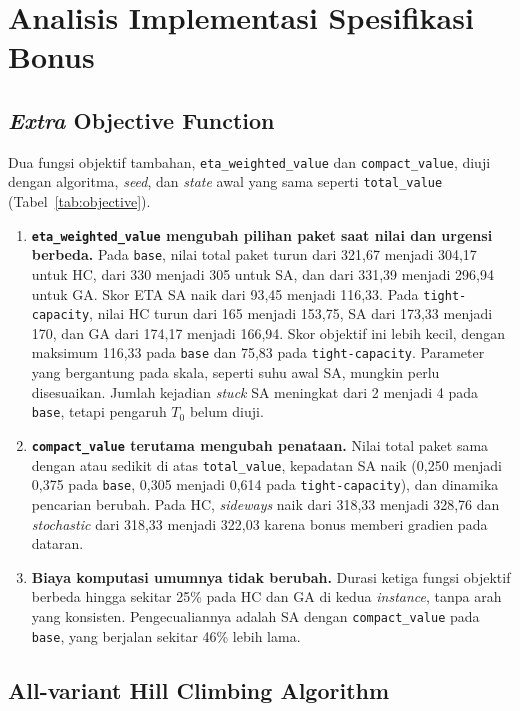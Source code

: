 \section{Analisis Implementasi Spesifikasi Bonus}

\subsection{\textit{Extra} Objective Function}

Dua fungsi objektif tambahan, \texttt{eta\_weighted\_value} dan \texttt{compact\_value}, diuji dengan algoritma, \textit{seed}, dan \textit{state} awal yang sama seperti \texttt{total\_value} (Tabel~\ref{tab:objective}).

\begin{enumerate}
    \item \textbf{\texttt{eta\_weighted\_value} mengubah pilihan paket saat nilai dan urgensi berbeda.} Pada \texttt{base}, nilai total paket turun dari 321,67 menjadi 304,17 untuk HC, dari 330 menjadi 305 untuk SA, dan dari 331,39 menjadi 296,94 untuk GA. Skor ETA SA naik dari 93,45 menjadi 116,33. Pada \texttt{tight-capacity}, nilai HC turun dari 165 menjadi 153,75, SA dari 173,33 menjadi 170, dan GA dari 174,17 menjadi 166,94. Skor objektif ini lebih kecil, dengan maksimum 116,33 pada \texttt{base} dan 75,83 pada \texttt{tight-capacity}. Parameter yang bergantung pada skala, seperti suhu awal SA, mungkin perlu disesuaikan. Jumlah kejadian \textit{stuck} SA meningkat dari 2 menjadi 4 pada \texttt{base}, tetapi pengaruh $T_0$ belum diuji.
    \item \textbf{\texttt{compact\_value} terutama mengubah penataan.} Nilai total paket sama dengan atau sedikit di atas \texttt{total\_value}, kepadatan SA naik (0,250 menjadi 0,375 pada \texttt{base}, 0,305 menjadi 0,614 pada \texttt{tight-capacity}), dan dinamika pencarian berubah. Pada HC, \textit{sideways} naik dari 318,33 menjadi 328,76 dan \textit{stochastic} dari 318,33 menjadi 322,03 karena bonus memberi gradien pada dataran.
    \item \textbf{Biaya komputasi umumnya tidak berubah.} Durasi ketiga fungsi objektif berbeda hingga sekitar 25\% pada HC dan GA di kedua \textit{instance}, tanpa arah yang konsisten. Pengecualiannya adalah SA dengan \texttt{compact\_value} pada \texttt{base}, yang berjalan sekitar 46\% lebih lama.
\end{enumerate}

\subsection{All-variant Hill Climbing Algorithm}

